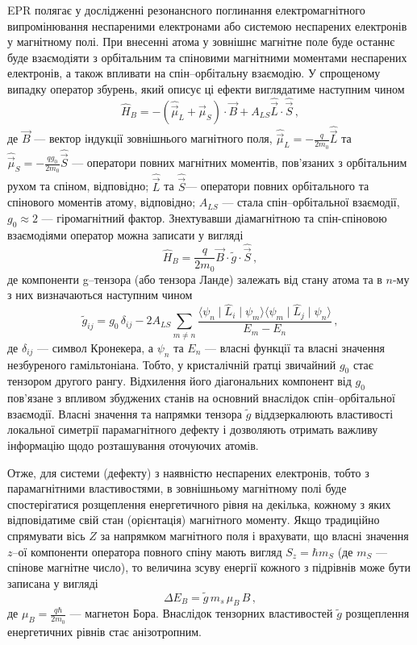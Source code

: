EPR полягає у дослідженні резонансного поглинання електромагнітного випромінювання неспареними
електронами або системою неспарених електронів у магнітному полі.
При внесенні атома у зовнішнє магнітне поле буде
останнє буде взаємодіяти з орбітальним та спіновими магнітними моментами
неспарених електронів, а також впливати на спін--орбітальну взаємодію.
У спрощеному випадку оператор збурень, який описує ці ефекти виглядатиме наступним чином
\begin{equation}
\hat{H}_B=-(\hat{\vec{\mu}}_L+\hat{\vec{\mu}}_S)\cdot\vec{B}+A_{LS}\hat{\vec{L}}\cdot\hat{\vec{S}}\,,
\end{equation}
де
$\vec{B}$ --- вектор індукції зовнішнього магнітного поля,
$\hat{\vec{\mu}}_L=-\frac{q}{2m_0}\hat{\vec{L}}$ та
$\hat{\vec{\mu}}_S=-\frac{qg_0}{2m_0}\hat{\vec{S}}$
--- оператори повних магнітних моментів, пов'язаних з орбітальним рухом та спіном,
відповідно;
$\hat{\vec{L}}$ та $\hat{\vec{S}}$--- оператори повних орбітального та спінового моментів атому, відповідно;
$A_{LS}$ --- стала спін--орбітальної взаємодії,
$g_0\!\approx\!2$ --- гіромагнітний фактор.
Знехтувавши діамагнітною та спін-спіновою взаємодіями оператор можна записати у
вигляді \cite{tuomisto2019}
\begin{equation}
\hat{H}_B=\frac{q}{2m_0}\vec{B}\cdot\tilde{g}\cdot\hat{\vec{S}}\,,
\end{equation}
де компоненти g--тензора (або тензора Ланде) залежать від стану
атома та в $n$-му з них визначаються наступним чином
\begin{equation}
\tilde{g}_{ij}=g_0\,\delta_{ij}-2A_{LS}\sum_{m\neq n}\frac{\langle\psi_n\mid\hat{L}_i\mid\psi_m\rangle
\langle\psi_m\mid\hat{L}_j\mid\psi_n\rangle}{E_m-E_n}\,,
\end{equation}
де
$\delta_{ij}$ --- символ Кронекера, а
$\psi_n$ та $E_n$ --- власні функції та власні значення незбуреного гамільтоніана.
Тобто, у кристалічній ґратці звичайний $g_0$ стає тензором другого рангу.
Відхилення його діагональних компонент  від $g_0$ пов'язане з впливом
збуджених станів на основний внаслідок спін--орбітальної взаємодії.
Власні значення та напрямки тензора $\tilde{g}$ віддзеркалюють
властивості локальної симетрії парамагнітного дефекту і дозволяють отримать
важливу інформацію щодо розташування оточуючих атомів.



Отже, для системи (дефекту) з наявністю неспарених електронів,
тобто з парамагнітними властивостями, в зовнішньому магнітному полі
буде спостерігатися розщеплення енергетичного рівня на декілька,
кожному з яких відповідатиме свій стан (орієнтація)
магнітного моменту.
Якщо традиційно спрямувати вісь $Z$ за напрямком магнітного поля і
врахувати, що власні значення $z$--ої компоненти оператора повного спіну
мають вигляд $S_z=\hbar m_S$
(де $m_S$ --- спінове магнітне число), то величина зсуву енергії кожного з підрівнів може бути записана у вигляді
\begin{equation}
\Delta E_B=\tilde{g}\,m_s\, \mu_B\,B\,,
\end{equation}
де
$\mu_B=\frac{q\hbar}{2m_0}$ --- магнетон Бора.
Внаслідок тензорних властивостей $\tilde{g}$ розщеплення енергетичних
рівнів стає анізотропним.

